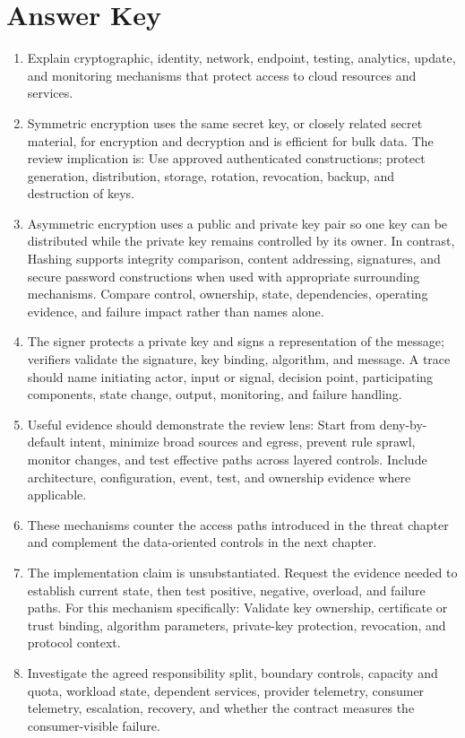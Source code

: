 \documentclass[11pt]{article}
\begin{document}
\section{Answer Key}
\begin{enumerate}
\item Explain cryptographic, identity, network, endpoint, testing, analytics, update, and monitoring mechanisms that protect access to cloud resources and services.
\item Symmetric encryption uses the same secret key, or closely related secret material, for encryption and decryption and is efficient for bulk data. The review implication is: Use approved authenticated constructions; protect generation, distribution, storage, rotation, revocation, backup, and destruction of keys.
\item Asymmetric encryption uses a public and private key pair so one key can be distributed while the private key remains controlled by its owner. In contrast, Hashing supports integrity comparison, content addressing, signatures, and secure password constructions when used with appropriate surrounding mechanisms. Compare control, ownership, state, dependencies, operating evidence, and failure impact rather than names alone.
\item The signer protects a private key and signs a representation of the message; verifiers validate the signature, key binding, algorithm, and message. A trace should name initiating actor, input or signal, decision point, participating components, state change, output, monitoring, and failure handling.
\item Useful evidence should demonstrate the review lens: Start from deny-by-default intent, minimize broad sources and egress, prevent rule sprawl, monitor changes, and test effective paths across layered controls. Include architecture, configuration, event, test, and ownership evidence where applicable.
\item These mechanisms counter the access paths introduced in the threat chapter and complement the data-oriented controls in the next chapter.
\item The implementation claim is unsubstantiated. Request the evidence needed to establish current state, then test positive, negative, overload, and failure paths. For this mechanism specifically: Validate key ownership, certificate or trust binding, algorithm parameters, private-key protection, revocation, and protocol context.
\item Investigate the agreed responsibility split, boundary controls, capacity and quota, workload state, dependent services, provider telemetry, consumer telemetry, escalation, recovery, and whether the contract measures the consumer-visible failure.

\end{enumerate}
\end{document}

